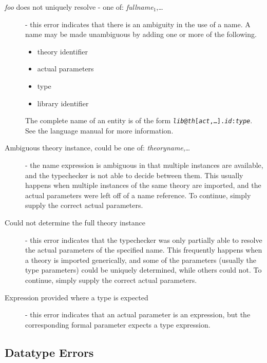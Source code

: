 \begin{description}

\item[{\em foo\/} does not uniquely resolve - one of: {\em
fullname$_1$},\ldots] - this error indicates that there is an ambiguity in
the use of a name.  A name may be made unambiguous by adding one or more
of the following.
\begin{itemize}
\item theory identifier
\item actual parameters
\item type
\item library identifier
\end{itemize}
The complete name of an entity is of the form
\texttt{\emph{lib}@\emph{th}[\emph{act},\ldots].\emph{id}:\emph{type}}.
See the language manual for more information.

\item[Ambiguous theory instance, could be one of:
\emph{theoryname},\ldots] - the name expression is ambiguous in that
multiple instances are available, and the typechecker is not able to
decide between them.  This usually happens when multiple instances of the
same theory are imported, and the actual parameters were left off of a
name reference.  To continue, simply supply the correct actual parameters.

\item[Could not determine the full theory instance] - this error indicates
that the typechecker was only partially able to resolve the actual parameters
of the specified name.  This frequently happens when a theory is imported
generically, and some of the parameters (usually the type parameters)
could be uniquely determined, while others could not.  To continue, simply
supply the correct actual parameters.

\item[Expression provided where a type is expected] - this error indicates
that an actual parameter is an expression, but the corresponding formal
parameter expects a type expression.

\end{description}


\subsection{Datatype Errors}

